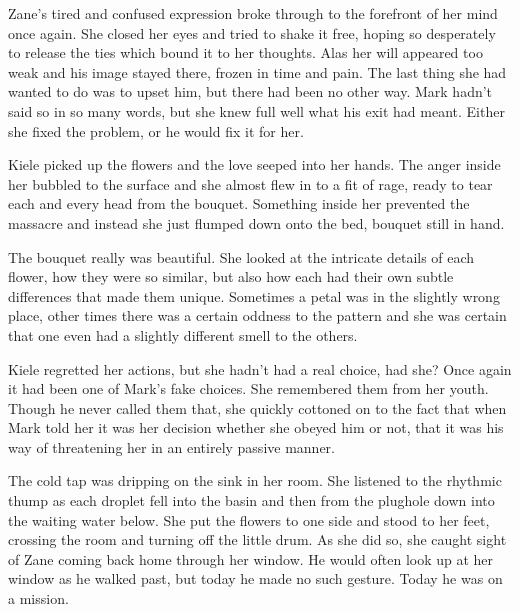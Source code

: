 Zane's tired and confused expression broke through to the forefront of her mind once again.  She closed her eyes and tried to shake it free, hoping so desperately to release the ties which bound it to her thoughts.  Alas her will appeared too weak and his image stayed there, frozen in time and pain.  The last thing she had wanted to do was to upset him, but there had been no other way.  Mark hadn't said so in so many words, but she knew full well what his exit had meant.  Either she fixed the problem, or he would fix it for her.

Kiele picked up the flowers and the love seeped into her hands.  The anger inside her bubbled to the surface and she almost flew in to a fit of rage, ready to tear each and every head from the bouquet.  Something inside her prevented the massacre and instead she just flumped down onto the bed, bouquet still in hand.

The bouquet really was beautiful.  She looked at the intricate details of each flower, how they were so similar, but also how each had their own subtle differences that made them unique.  Sometimes a petal was in the slightly wrong place, other times there was a certain oddness to the pattern and she was certain that one even had a slightly different smell to the others.

Kiele regretted her actions, but she hadn't had a real choice, had she?  Once again it had been one of Mark's fake choices.  She remembered them from her youth.  Though he never called them that, she quickly cottoned on to the fact that when Mark told her it was her decision whether she obeyed him or not, that it was his way of threatening her in an entirely passive manner.

The cold tap was dripping on the sink in her room.  She listened to the rhythmic thump as each droplet fell into the basin and then from the plughole down into the waiting water below.  She put the flowers to one side and stood to her feet, crossing the room and turning off the little drum.  As she did so, she caught sight of Zane coming back home through her window.  He would often look up at her window as he walked past, but today he made no such gesture.  Today he was on a mission.





